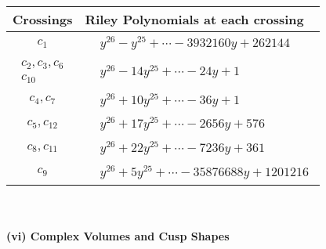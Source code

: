 \documentclass[1p]{elsarticle_modified}
\theoremstyle{definition}
\begin{document}
\begin{tabular}{m{50pt}|m{274pt}}
Crossings & \hspace{64pt}Riley Polynomials at each crossing \\
\hline $$\begin{aligned}c_{1}\end{aligned}$$&$\begin{aligned}
&y^{26}- y^{25}+\cdots-3932160 y+262144
\end{aligned}$\\
\hline $$\begin{aligned}c_{2},c_{3},c_{6}\\c_{10}\end{aligned}$$&$\begin{aligned}
&y^{26}-14 y^{25}+\cdots-24 y+1
\end{aligned}$\\
\hline $$\begin{aligned}c_{4},c_{7}\end{aligned}$$&$\begin{aligned}
&y^{26}+10 y^{25}+\cdots-36 y+1
\end{aligned}$\\
\hline $$\begin{aligned}c_{5},c_{12}\end{aligned}$$&$\begin{aligned}
&y^{26}+17 y^{25}+\cdots-2656 y+576
\end{aligned}$\\
\hline $$\begin{aligned}c_{8},c_{11}\end{aligned}$$&$\begin{aligned}
&y^{26}+22 y^{25}+\cdots-7236 y+361
\end{aligned}$\\
\hline $$\begin{aligned}c_{9}\end{aligned}$$&$\begin{aligned}
&y^{26}+5 y^{25}+\cdots-35876688 y+1201216
\end{aligned}$\\
\hline
\end{tabular}\\~\\
\newpage\flushleft \textbf{(vi) Complex Volumes and Cusp Shapes}
\end{document}
